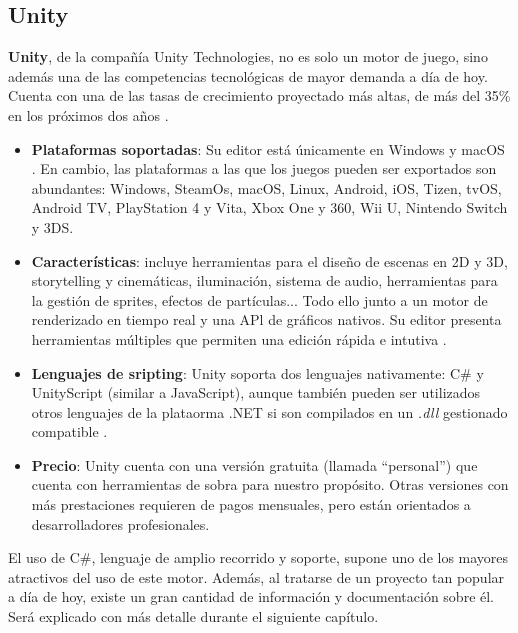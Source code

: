 \subsection{Unity}
\textbf{Unity}, de la compañía Unity Technologies, no es solo un motor de juego, sino además una de las competencias tecnológicas de mayor demanda a día de hoy. Cuenta con una de las tasas de crecimiento proyectado más altas, de más del 35\% en los próximos dos años \cite{learnunity}.
\begin{itemize}
\item \textbf{Plataformas soportadas}: Su editor está únicamente en Windows y macOS \cite{srunity}. En cambio, las plataformas a las que los juegos pueden ser exportados son abundantes: Windows, SteamOs, macOS, Linux, Android, iOS, Tizen, tvOS, Android TV, PlayStation 4 y Vita, Xbox One y 360, Wii U, Nintendo Switch y 3DS.
\item \textbf{Características}: incluye herramientas para el diseño de escenas en 2D y 3D, storytelling y cinemáticas, iluminación, sistema de audio, herramientas para la gestión de sprites, efectos de partículas... Todo ello junto a un motor de renderizado en tiempo real y una APl de gráficos nativos. Su editor presenta herramientas múltiples que permiten una edición rápida e intutiva \cite{featuresunity}.
\item \textbf{Lenguajes de sripting}: Unity soporta dos lenguajes nativamente: C\# y UnityScript (similar a JavaScript), aunque también pueden ser utilizados otros lenguajes de la plataorma .NET si son compilados en un \textit{.dll} gestionado compatible \cite{languagesunity}.
\item \textbf{Precio}: Unity cuenta con una versión gratuita (llamada ``personal'') que cuenta con herramientas de sobra para nuestro propósito. Otras versiones con más prestaciones requieren de pagos mensuales, pero están orientados a desarrolladores profesionales.
\end{itemize}

El uso de C\#, lenguaje de amplio recorrido y soporte, supone uno de los mayores atractivos del uso de este motor. Además, al tratarse de un proyecto tan popular a día de hoy, existe un gran cantidad de información y documentación sobre él. Será explicado con más detalle durante el siguiente capítulo.